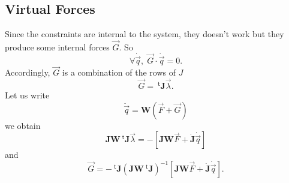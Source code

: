\documentclass[aps,twocolumn]{revtex4}
\newcommand{\mymat}[1]{\boldsymbol{#1}}
\newcommand{\mytrn}[1]{{\!\!~^{\mathsf{t}}{#1}}}
\newcommand{\q}{\vec{q}}
\newcommand{\dq}{\dot{\q}}
\newcommand{\ddq}{\ddot{\q}}
\newcommand{\J}{\mymat{J}}
\newcommand{\dJ}{\dot{\J}}
\newcommand{\tJ}{\mytrn{\J}}
\newcommand{\G}{\vec{G}}
\newcommand{\W}{\mymat{W}}
\begin{document}
\subsection{Virtual Forces}
Since the constraints are internal to the system, they doesn't work but they produce some internal
forces $\G$. So
\begin{equation}
\forall \dq, \; \G\cdot\dq = 0.
\end{equation}
Accordingly, $\G$ is a combination of the rows of $J$
\begin{equation}
	\G = \tJ \vec{\lambda}.
\end{equation}
Let us write
\begin{equation}
	\ddq = \W \left( \vec{F} + \G \right)
\end{equation}
we obtain
\begin{equation}
	\J \W \tJ \vec{\lambda} = -\left\lbrack \J\W\vec{F} + \dJ \dq \right\rbrack
\end{equation}
and
\begin{equation}
	\G = - \tJ \left(\J \W \tJ \right)^{-1}\left\lbrack \J\W\vec{F} + \dJ \dq \right\rbrack.
\end{equation}
\end{document}
